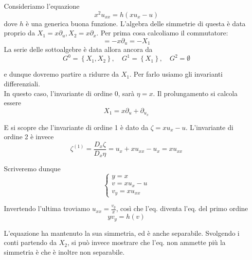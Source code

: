 \documentclass{report}
\begin{document}
\begin{example}
    Consideriamo l'equazione
    \begin{equation}
        x^2u_{xx} = h(xu_x - u)
    \end{equation}
    dove $h$ è una generica buona funzione. L'algebra delle simmetrie di questa è data proprio da $X_1 = x\partial_u, X_2 = x\partial_x$. Per prima cosa calcoliamo il commutatore: 
    \begin{equation}
        [X_1, X_2] = -x\partial_u = -X_1
    \end{equation}
    La serie delle sottoalgebre è data allora ancora da 
    \begin{equation}
    G^0 = \left\{X_1, X_2\right\}, \quad G^{1} = \left\{X_1\right\}, \quad G^2=\emptyset
    \end{equation}

    e dunque dovremo partire a ridurre da $X_1$. Per farlo usiamo gli invarianti differenziali. \\

    In questo caso, l'invariante di ordine 0, sarà $\eta = x$. Il prolungamento si calcola essere
    \begin{equation}
        X_1 = x\partial_u + \partial_{u_x}
    \end{equation}

    E si scopre che l'invariante di ordine 1 è dato da $\zeta = xu_x - u$. L'invariante di ordine 2 è invece 
    \begin{equation}
        \zeta^{(1)} = \frac{D_x\zeta}{D_x\eta} = u_x + xu_{xx} - u_x = xu_{xx}
    \end{equation}

    Scriveremo dunque 
    \[\begin{cases}
        y = x \\ v = xu_x - u \\ v_y = xu_{xx}
    \end{cases}\]

    Invertendo l'ultima troviamo $u_{xx} = \frac{v_y}{x}$, così che l'eq. diventa l'eq. del primo ordine
    \begin{equation}
        yv_y = h(v)
    \end{equation}

    L'equazione ha mantenuto la sua simmetria, ed è anche separabile. Svolgendo i conti partendo da $X_2$, si può invece mostrare che l'eq. non ammette più la simmetria è che è inoltre non separabile. 
\end{example}
\end{document}
